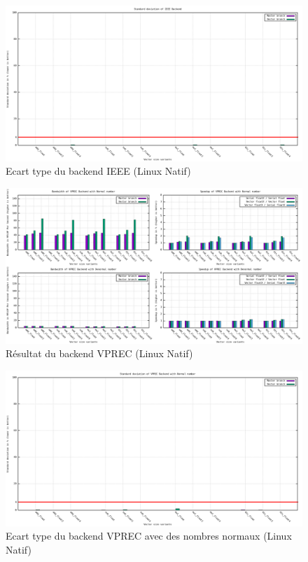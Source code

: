 \documentclass[11pt, letterpaper]{article}
\begin{document}
\begin{figure}[htbp]
\centering
\includegraphics[width=450px]{../ressources/laptop_ieee_stddev.png}
\caption{\label{fig:org684c0c2}Ecart type du backend IEEE (Linux Natif)}
\end{figure}

\begin{figure}[htbp]
\centering
\includegraphics[width=450px]{../ressources/laptop_vprec.png}
\caption{\label{fig:org39136af}Résultat du backend VPREC (Linux Natif)}
\end{figure}

\begin{figure}[htbp]
\centering
\includegraphics[width=450px]{../ressources/laptop_vprec_normal_stddev.png}
\caption{\label{fig:orgc99d59e}Ecart type du backend VPREC avec des nombres normaux (Linux Natif)}
\end{figure}
\end{document}
